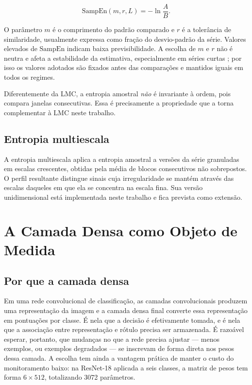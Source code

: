 \begin{equation}
    \mathrm{SampEn}(m, r, L) = -\ln \frac{A}{B}.
    \label{eq:sampen}
\end{equation}

O parâmetro $m$ é o comprimento do padrão comparado e $r$ é a tolerância de
similaridade, usualmente expressa como fração do desvio-padrão da série. Valores
elevados de $\mathrm{SampEn}$ indicam baixa previsibilidade. A escolha de $m$ e
$r$ não é neutra e afeta a estabilidade da estimativa, especialmente em séries
curtas \cite{yentes2013}; por isso os valores adotados são fixados antes das
comparações e mantidos iguais em todos os regimes.

Diferentemente da LMC, a entropia amostral \emph{não} é invariante à ordem, pois
compara janelas consecutivas. Essa é precisamente a propriedade que a torna
complementar à LMC neste trabalho.

\subsection{Entropia multiescala}

A entropia multiescala \cite{costa2002, costa2005} aplica a entropia amostral a
versões da série granuladas em escalas crescentes, obtidas pela média de blocos
consecutivos não sobrepostos. O perfil resultante distingue sinais cuja
irregularidade se mantém através das escalas daqueles em que ela se concentra
na escala fina. Sua versão unidimensional está implementada neste trabalho e
fica prevista como extensão.

\section{A Camada Densa como Objeto de Medida}
\label{sec:T-camada}

\subsection{Por que a camada densa}

Em uma rede convolucional de classificação, as camadas convolucionais produzem
uma representação da imagem e a camada densa final converte essa representação
em pontuações por classe. É nela que a decisão é efetivamente tomada, e é nela
que a associação entre representação e rótulo precisa ser armazenada. É
razoável esperar, portanto, que mudanças no que a rede precisa ajustar --- menos
exemplos, ou exemplos degradados --- se inscrevam de forma direta nos pesos
dessa camada. A escolha
tem ainda a vantagem prática de manter o custo do monitoramento baixo: na
ResNet-18 aplicada a seis classes, a matriz de pesos tem forma $6 \times 512$,
totalizando \num{3072} parâmetros.


